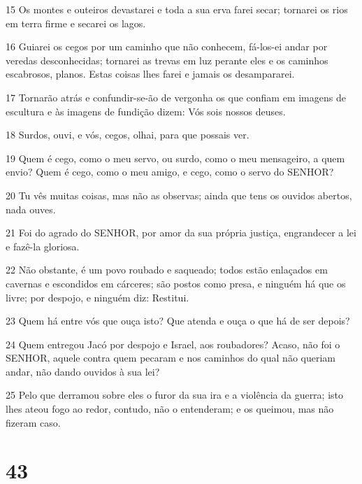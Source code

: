 \par 15 Os montes e outeiros devastarei e toda a sua erva farei secar; tornarei os rios em terra firme e secarei os lagos.
\par 16 Guiarei os cegos por um caminho que não conhecem, fá-los-ei andar por veredas desconhecidas; tornarei as trevas em luz perante eles e os caminhos escabrosos, planos. Estas coisas lhes farei e jamais os desampararei.
\par 17 Tornarão atrás e confundir-se-ão de vergonha os que confiam em imagens de escultura e às imagens de fundição dizem: Vós sois nossos deuses.
\par 18 Surdos, ouvi, e vós, cegos, olhai, para que possais ver.
\par 19 Quem é cego, como o meu servo, ou surdo, como o meu mensageiro, a quem envio? Quem é cego, como o meu amigo, e cego, como o servo do SENHOR?
\par 20 Tu vês muitas coisas, mas não as observas; ainda que tens os ouvidos abertos, nada ouves.
\par 21 Foi do agrado do SENHOR, por amor da sua própria justiça, engrandecer a lei e fazê-la gloriosa.
\par 22 Não obstante, é um povo roubado e saqueado; todos estão enlaçados em cavernas e escondidos em cárceres; são postos como presa, e ninguém há que os livre; por despojo, e ninguém diz: Restitui.
\par 23 Quem há entre vós que ouça isto? Que atenda e ouça o que há de ser depois?
\par 24 Quem entregou Jacó por despojo e Israel, aos roubadores? Acaso, não foi o SENHOR, aquele contra quem pecaram e nos caminhos do qual não queriam andar, não dando ouvidos à sua lei?
\par 25 Pelo que derramou sobre eles o furor da sua ira e a violência da guerra; isto lhes ateou fogo ao redor, contudo, não o entenderam; e os queimou, mas não fizeram caso.

\chapter{43}

